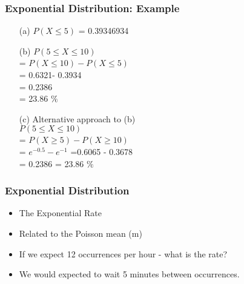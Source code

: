 
\begin{frame}[fragile]
\frametitle{Exponential Distribution: Example}

\begin{itemize}
\item[(a)] $P(X \leq 5)$ = 0.39346934
\item[(b)] $P(5 \leq X \leq 10)$ \\ = $P( X \leq 10) - P( X \leq 5)$ \\ = 0.6321- 0.3934 \\ = 0.2386 \\= 23.86 $\%$
\item[(c)] Alternative approach to (b)\\$P(5 \leq X \leq 10)$ \\ = $P( X \geq 5) - P( X \geq 10)$ \\
= $e^{-0.5} - e^{-1}$
=0.6065 - 0.3678\\
= 0.2386 = 23.86 $\%$
\end{itemize}

\end{frame}



\begin{frame}[fragile]
\frametitle{Exponential Distribution}
\begin{itemize}
\item The Exponential Rate
\item Related to the Poisson mean (m)
\item If we expect 12 occurrences per hour - what is the rate?
\item We would expected to wait 5 minutes between occurrences.
\end{itemize}
\end{frame}

